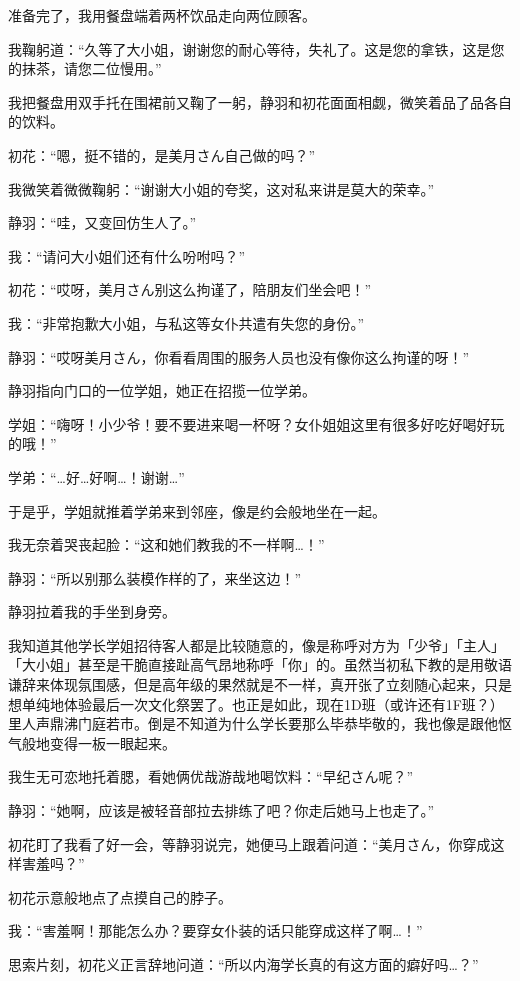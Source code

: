 准备完了，我用餐盘端着两杯饮品走向两位顾客。

我鞠躬道：“久等了大小姐，谢谢您的耐心等待，失礼了。这是您的拿铁，这是您的抹茶，请您二位慢用。”

我把餐盘用双手托在围裙前又鞠了一躬，静羽和初花面面相觑，微笑着品了品各自的饮料。

初花：“嗯，挺不错的，是美月さん自己做的吗？”

我微笑着微微鞠躬：“谢谢大小姐的夸奖，这对私来讲是莫大的荣幸。”

静羽：“哇，又变回仿生人了。”

我：“请问大小姐们还有什么吩咐吗？”

初花：“哎呀，美月さん别这么拘谨了，陪朋友们坐会吧！”

我：“非常抱歉大小姐，与私这等女仆共遣有失您的身份。”

静羽：“哎呀美月さん，你看看周围的服务人员也没有像你这么拘谨的呀！”

静羽指向门口的一位学姐，她正在招揽一位学弟。

学姐：“嗨呀！小少爷！要不要进来喝一杯呀？女仆姐姐这里有很多好吃好喝好玩的哦！”

学弟：“…好…好啊…！谢谢…”

于是乎，学姐就推着学弟来到邻座，像是约会般地坐在一起。

我无奈着哭丧起脸：“这和她们教我的不一样啊…！\smilecry”

静羽：“所以别那么装模作样的了，来坐这边！”

静羽拉着我的手坐到身旁。

我知道其他学长学姐招待客人都是比较随意的，像是称呼对方为「少爷」「主人」「大小姐」甚至是干脆直接趾高气昂地称呼「你」的。虽然当初私下教的是用敬语谦辞来体现氛围感，但是高年级的果然就是不一样，真开张了立刻随心起来，只是想单纯地体验最后一次文化祭罢了。也正是如此，现在1D班（或许还有1F班？）里人声鼎沸门庭若市。倒是不知道为什么学长要那么毕恭毕敬的，我也像是跟他怄气般地变得一板一眼起来。

我生无可恋地托着腮，看她俩优哉游哉地喝饮料：“早纪さん呢？”

静羽：“她啊，应该是被轻音部拉去排练了吧？你走后她马上也走了。”

初花盯了我看了好一会，等静羽说完，她便马上跟着问道：“美月さん，你穿成这样害羞吗？”

初花示意般地点了点摸自己的脖子。

我：“害羞啊！那能怎么办？要穿女仆装的话只能穿成这样了啊…！”

思索片刻，初花义正言辞地问道：“所以内海学长真的有这方面的癖好吗…？”

